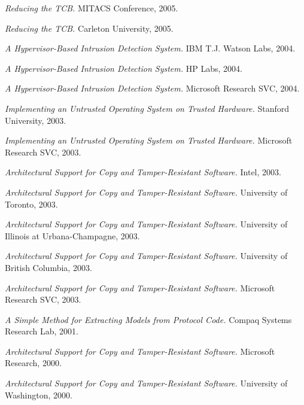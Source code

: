 \documentclass[10pt]{article}
\newenvironment{lonelist}[1][\enskip\textbullet]%
        {\vspace{-\baselineskip}\begin{list}{#1}{%
        \setlength{\partopsep}{0pt}%
        \setlength{\topsep}{0pt}
	\setlength{\leftmargin}{0pt}}}
        {\end{list}\vspace{-.6\baselineskip}}
\newenvironment{innerenum}[1][1.]%
        {\begin{compactenum}[#1]}{\end{compactenum}}
\begin{document}
\begin{lonelist}
\begin{innerenum}
\item {\em Reducing the TCB.}	MITACS Conference, 2005.
\item {\em Reducing the TCB.} Carleton University, 2005.
\item {\em A Hypervisor-Based Intrusion Detection System.} IBM T.J. Watson Labs, 2004.
\item {\em A Hypervisor-Based Intrusion Detection System.} HP Labs, 2004.
\item {\em A Hypervisor-Based Intrusion Detection System.} Microsoft Research SVC, 2004.
\item {\em Implementing an Untrusted Operating System on Trusted Hardware.} Stanford University, 2003.
\item {\em Implementing an Untrusted Operating System on Trusted Hardware.} Microsoft Research SVC, 2003.
\item {\em Architectural Support for Copy and Tamper-Resistant Software.} Intel, 2003.
\item {\em Architectural Support for Copy and Tamper-Resistant Software.} University of Toronto, 2003.
\item {\em Architectural Support for Copy and Tamper-Resistant Software.} University of Illinois at Urbana-Champagne, 2003.
\item {\em Architectural Support for Copy and Tamper-Resistant Software.} University of British Columbia, 2003.
\item {\em Architectural Support for Copy and Tamper-Resistant Software.} Microsoft Research SVC, 2003.
\item {\em A Simple Method for Extracting Models from Protocol Code.} Compaq Systems Research Lab, 2001.
\item {\em Architectural Support for Copy and Tamper-Resistant Software.} Microsoft Research, 2000.
\item {\em Architectural Support for Copy and Tamper-Resistant Software.} University of Washington, 2000.
\end{innerenum}
\end{lonelist}
\end{document}
